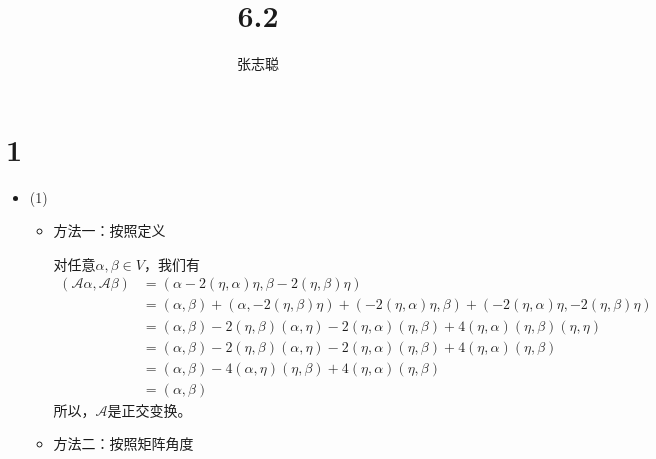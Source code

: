 \documentclass{article}
\begin{document}
\title{6.2}
\author{张志聪}
\maketitle

\section*{1}

\begin{itemize}
  \item (1)

        \begin{itemize}
          \item 方法一：按照定义

                对任意$\alpha, \beta \in V$，我们有
                \begin{align*}
                  (\mathscr{A} \alpha, \mathscr{A} \beta)
                   & = (\alpha - 2(\eta,\alpha)\eta, \beta - 2(\eta, \beta)\eta)                                                                       \\
                   & = (\alpha, \beta) + (\alpha, - 2(\eta, \beta)\eta) + (- 2(\eta,\alpha)\eta, \beta) + (- 2(\eta,\alpha)\eta, - 2(\eta, \beta)\eta) \\
                   & = (\alpha, \beta) - 2(\eta, \beta) (\alpha, \eta) - 2(\eta, \alpha) (\eta, \beta) + 4 (\eta,\alpha)(\eta, \beta) (\eta, \eta)     \\
                   & = (\alpha, \beta) - 2(\eta, \beta) (\alpha, \eta) - 2(\eta, \alpha) (\eta, \beta) + 4 (\eta,\alpha)(\eta, \beta)                  \\
                   & = (\alpha, \beta) - 4(\alpha, \eta) (\eta, \beta) + 4 (\eta,\alpha)(\eta, \beta)                                                  \\
                   & = (\alpha, \beta)
                \end{align*}
                所以，$\mathscr{A}$是正交变换。

          \item 方法二：按照矩阵角度


\end{itemize}
\end{itemize}
\end{document}
